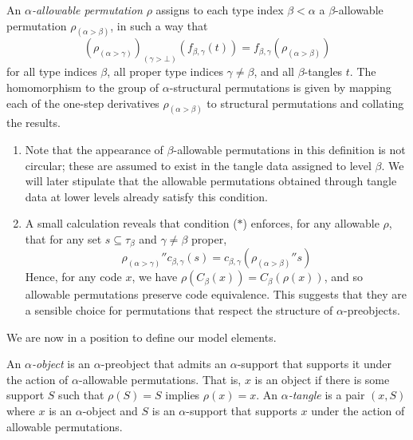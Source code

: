 \begin{definition}
    An \emph{\( \alpha \)-allowable permutation} \( \rho \) assigns to each type index \( \beta < \alpha \) a \( \beta \)-allowable permutation \( \rho_{(\alpha > \beta)} \), in such a way that
    \begin{equation}
        (\rho_{(\alpha > \gamma)})_{(\gamma > \bot)}(f_{\beta,\gamma}(t)) = f_{\beta,\gamma}(\rho_{(\alpha > \beta)})
        \tag{\( \ast \)}
    \end{equation}
    for all type indices \( \beta \), all proper type indices \( \gamma \neq \beta \), and all \( \beta \)-tangles \( t \).
    The homomorphism to the group of \( \alpha \)-structural permutations is given by mapping each of the one-step derivatives \( \rho_{(\alpha > \beta)} \) to structural permutations and collating the results.
\end{definition}
\begin{remark}
    \begin{enumerate}
        \item Note that the appearance of \( \beta \)-allowable permutations in this definition is not circular; these are assumed to exist in the tangle data assigned to level \( \beta \).
        We will later stipulate that the allowable permutations obtained through tangle data at lower levels already satisfy this condition.
        \item A small calculation reveals that condition (\( \ast \)) enforces, for any allowable \( \rho \), that for any set \( s \subseteq \tau_\beta \) and \( \gamma \neq \beta \) proper, \[ {\rho_{(\alpha > \gamma)}} '' c_{\beta,\gamma}(s) = c_{\beta,\gamma}({\rho_{(\alpha > \beta)}} '' s) \]
        Hence, for any code \( x \), we have \( \rho(C_\beta(x)) = C_\beta(\rho(x)) \), and so allowable permutations preserve code equivalence.
        This suggests that they are a sensible choice for permutations that respect the structure of \( \alpha \)-preobjects.
    \end{enumerate}
\end{remark}

We are now in a position to define our model elements.

\begin{definition}
    An \emph{\( \alpha \)-object} is an \( \alpha \)-preobject that admits an \( \alpha \)-support that supports it under the action of \( \alpha \)-allowable permutations.
    That is, \( x \) is an object if there is some support \( S \) such that \( \rho(S) = S \) implies \( \rho(x) = x \).
    An \emph{\( \alpha \)-tangle} is a pair \( (x, S) \) where \( x \) is an \( \alpha \)-object and \( S \) is an \( \alpha \)-support that supports \( x \) under the action of allowable permutations.
\end{definition}

